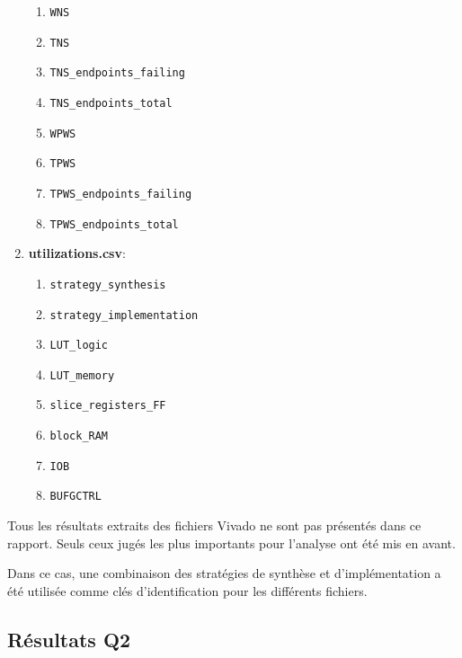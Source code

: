 \documentclass[../CSC_5RO07_TA.tex]{subfiles}
\begin{document}
\begin{enumerate}
\begin{enumerate}[noitemsep]
        \item \texttt{WNS}
        \item \texttt{TNS}
        \item \texttt{TNS\_endpoints\_failing}
        \item \texttt{TNS\_endpoints\_total}
        \item \texttt{WPWS}
        \item \texttt{TPWS}
        \item \texttt{TPWS\_endpoints\_failing}
        \item \texttt{TPWS\_endpoints\_total}
    \end{enumerate}
    \item \textbf{utilizations.csv}:
    \begin{enumerate}[noitemsep]
        \item \texttt{strategy\_synthesis}
        \item \texttt{strategy\_implementation}
        \item \texttt{LUT\_logic}
        \item \texttt{LUT\_memory}
        \item \texttt{slice\_registers\_FF}
        \item \texttt{block\_RAM}
        \item \texttt{IOB}
        \item \texttt{BUFGCTRL}
    \end{enumerate}
\end{enumerate}
\begin{remark}
    Tous les résultats extraits des fichiers Vivado ne sont pas présentés dans ce rapport. Seuls ceux jugés les plus importants pour l'analyse ont été mis en avant.
\end{remark}
\noindent Dans ce cas, une combinaison des stratégies de synthèse et d'implémentation a été utilisée comme clés d'identification pour les différents fichiers.


\subsection{Résultats Q2}
\end{document}

